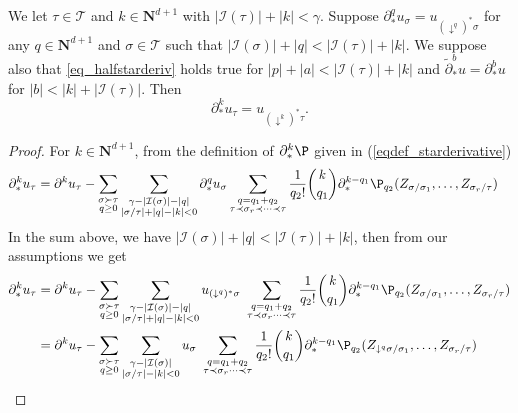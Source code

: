 \documentclass[11pt]{preprint}
\newcommand{\mcI}{\mathcal{I}}
\newcommand{\mcT}{\mathcal{T}}
\def\eqref#1{(\ref{#1})}
\newcommand{\bfN}{\mathbf{N}}
\begin{document}
	\begin{lemma}\label{lem_deriv_uk_induction}
		We let $\tau\in\mcT$ and $k\in\bfN^{d+1}$ with $|\mcI(\tau)|+|k|<\gamma$.
 		Suppose $\partial^q_*u_\sigma = u_{(\downarrow^q)^*\sigma} $ for any $q\in\bfN^{d+1}$ and $\sigma\in\mcT$ such that $|\mcI(\sigma)|+|q|<|\mcI(\tau)|+|k|$. We suppose also that \ref{eq_halfstarderiv} holds true for $|p|+|a|<|\mcI(\tau)| + |k|$ and $\widetilde\partial^b_*u= \partial^b_*u$ for $|b|<|k|+|\mcI(\tau)|$.
 		Then
 		$$
 		\partial^k_*u_\tau = u_{(\downarrow^k)^*\tau}.
 		$$
	\end{lemma}
	\begin{proof}
		
	
	For $k\in\bfN^{d+1}$, from the definition of $\partial^k_*\P$ given in \eqref{eqdef_starderivative}
		\begin{align*}
			\partial_*^{k} u_\tau &= \partial^{k} u_\tau  -\sum_{\substack{\sigma\succ\tau \\ q\geq0 }} \sum_{\substack{ \gamma-|\mcI(\sigma)|-|q| \\ |\sigma/\tau|+|q|-|k|<0           }} \partial^q_*u_\sigma \sum_{\substack{q=q_1+q_2\\ \tau\prec\sigma_r\prec\dots\prec\tau }} \frac{1}{q_2!}\binom{k}{q_1}\partial^{k-q_1}_*\P_{q_2}(Z_{\sigma/\sigma_1},\dots,Z_{\sigma_r/\tau})
		\end{align*}
		In the sum above, we have $|\mcI(\sigma)|+|q|<|\mcI(\tau)|+|k|$, then from our assumptions we get 
		\begin{align*}
			\partial_*^{k} u_\tau &= \partial^{k} u_\tau  -\sum_{\substack{\sigma\succ\tau \\ q\geq0 }} \sum_{\substack{ \gamma-|\mcI(\sigma)|-|q| \\ |\sigma/\tau|+|q|-|k|<0           }} u_{(\downarrow^q)^*\sigma} \,\,  \sum_{\substack{q=q_1+q_2\\ \tau\prec\sigma_r\dots\prec\tau }} \frac{1}{q_2!}\binom{k}{q_1}\partial^{k-q_1}_*\P_{q_2}(Z_{\sigma/\sigma_1},\dots,Z_{\sigma_r/\tau})
			\\
			&= \partial^{k} u_\tau  -\sum_{\substack{\sigma\succ\tau \\ q\geq0 }} \sum_{\substack{ \gamma-|\mcI(\sigma)| \\ |\sigma/\tau|-|k|<0           }} u_\sigma \, \, \sum_{\substack{q=q_1+q_2\\ \tau\prec\sigma_r\dots\prec\tau }} \frac{1}{q_2!}\binom{k}{q_1}\partial^{k-q_1}_*\P_{q_2}(Z_{\downarrow^q\sigma/\sigma_1},\dots,Z_{\sigma_r/\tau})
		\end{align*}
		

\end{proof}
\end{document}
